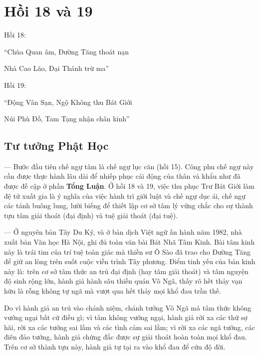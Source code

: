 \chapter{Hồi 18 và 19} %
\label{cha:hoi_18_19}

Hồi 18:

\begin{itshape}
``Chùa Quan âm, Đường Tăng thoát nạn

Nhà Cao Lão, Đại Thánh trừ ma''

\end{itshape}

Hồi 19:

\begin{itshape}
``Động Vân Sạn, Ngộ Không thu Bát Giới

Núi Phù Đồ, Tam Tạng nhận chân kinh''
\end{itshape}

\section{Tư tưởng Phật Học} %
\label{sec:18_19_phat_hoc}

— Bước đầu tiên chế ngự tâm là chế ngự lục căn (hồi 15). Công phu chế ngự này cần được thực hành lâu dài để nhiếp phục cái động của thân và khẩu như đã được đề cập ở phần {\bf Tổng Luận}. Ở hồi 18 và 19, việc thu phục Trư Bát Giới làm đệ tử xuất gia là ý nghĩa của việc hành trì giới luật và chế ngự dục ái, chế ngự các tánh buông lung, lười biếng để thiết lập cơ sở tâm lý vững chắc cho sự thành tựu tâm giải thoát (đại định) và tuệ giải thoát (đại tuệ).

— Ở nguyên bản Tây Du Ký, và ở bản dịch Việt ngữ ấn hành năm 1982, nhà xuất bản Văn học Hà Nội, ghi đủ toàn văn bài Bát Nhã Tâm Kinh. Bài tâm kinh này là trái tim của trí tuệ toàn giác mà thiền sư Ô Sào đã trao cho Đường Tăng để giữ an lòng trên suốt cuộc viễn trình Tây phương. Điểm tinh yếu của bản kinh này là: trên cơ sở tâm thức an trú đại định (hay tâm giải thoát) và tâm nguyện độ sinh rộng lớn, hành giả hành sâu thiền quán Vô Ngã, thấy rõ hết thảy vạn hữu là rỗng không tự ngã mà vượt qua hết thảy mọi khổ đau trần thế.

Do vì hành giả an trú vào chánh niệm, chánh tưởng Vô Ngã mà tâm thức không vướng ngại bất cứ điều gì; vì tâm không vướng ngại, hành giả rời xa các thứ sợ hãi, rời xa các tưởng sai lầm và các tình cảm sai lầm; vì rời xa các ngã tưởng, các điên đảo tưởng, hành giả chứng đắc được sự giải thoát hoàn toàn mọi khổ đau. Trên cơ sở thành tựu này, hành giả tự tại ra vào khổ đau để cứu độ đời.

